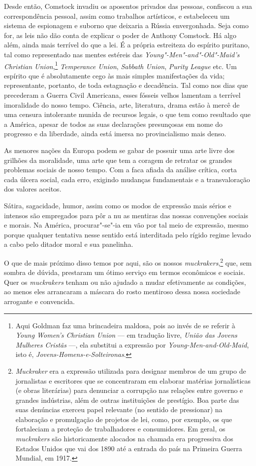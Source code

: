 Desde então, Comstock invadiu os aposentos privados das pessoas,
confiscou a sua correspondência pessoal, assim como trabalhos
artísticos, e estabeleceu um sistema de espionagem e suborno que
deixaria a Rússia envergonhada. Seja como for, as leis não dão conta de
explicar o poder de Anthony Comstock. Há algo além, ainda mais terrível
do que a lei. É a própria estreiteza do espírito puritano, tal como
representado nas mentes estéreis das \textit{Young"-Men"-and"-Old"-Maid's
Christian Union},\footnote{Aqui Goldman
  faz uma brincadeira maldosa, pois ao invés de se referir à
  \textit{Young Women's Christian Union} --- em tradução livre, \textit{União das Jovens Mulheres Cristãs} ---, ela substitui a expressão por \textit{Young-Men-and-Old-Maid}, isto é, \textit{Jovens-Homens-e-Solteironas}.} \textit{Temperance Union}, \textit{Sabbath Union},
\textit{Purity League} etc. Um espírito que é absolutamente cego às mais
simples manifestações da vida; representante, portanto, de toda
estagnação e decadência. Tal como nos dias que precederam a Guerra Civil
Americana, esses fósseis velhos lamentam a
terrível imoralidade do nosso tempo. Ciência, arte, literatura, drama
estão à mercê de uma censura intolerante munida de recursos legais, o
que tem como resultado que a América, apesar de todos as suas
declarações presunçosas em nome do progresso e da liberdade, ainda está
imersa no provincialismo mais denso.

As menores nações da Europa podem se gabar de possuir uma arte livre dos
grilhões da moralidade, uma arte que tem a coragem de retratar os
grandes problemas sociais de nosso tempo. Com a faca afiada da análise
crítica, corta cada úlcera social, cada erro, exigindo mudanças
fundamentais e a transvaloração dos valores aceitos.

Sátira, sagacidade, humor, assim como os modos de expressão mais sérios
e intensos são empregados para pôr a nu as mentiras das nossas
convenções sociais e morais. Na América, procurar"-se"-ia em vão por tal
meio de expressão, mesmo porque qualquer tentativa nesse sentido está
interditada pelo rígido regime levado a cabo pelo ditador moral e sua
panelinha.

O que de mais próximo disso temos por aqui, são os nossos
\textit{muckrakers},\footnote{\textit{Muckraker} era a expressão utilizada
  para designar membros de um grupo de jornalistas e escritores que
  se concentraram em elaborar matérias jornalísticas (e obras
  literárias) para denunciar a corrupção nas relações entre governo e
  grandes indústrias, além de outras instituições de prestígio. Boa
  parte das suas denúncias exerceu papel relevante (no sentido de
  pressionar) na elaboração e promulgação de projetos de lei, como, por
  exemplo, os que fortaleciam a proteção de trabalhadores e
  consumidores. Em geral, os \textit{muckrakers} são historicamente
  alocados na chamada era progressiva dos Estados Unidos que vai dos
  1890 até a entrada do país na Primeira Guerra Mundial, em 1917.} que,
sem sombra de dúvida, prestaram um ótimo serviço em termos econômicos e
sociais. Quer os \textit{muckrakers} tenham ou não ajudado a mudar
efetivamente as condições, ao menos eles arrancaram a máscara do rosto
mentiroso dessa nossa sociedade arrogante e convencida.

